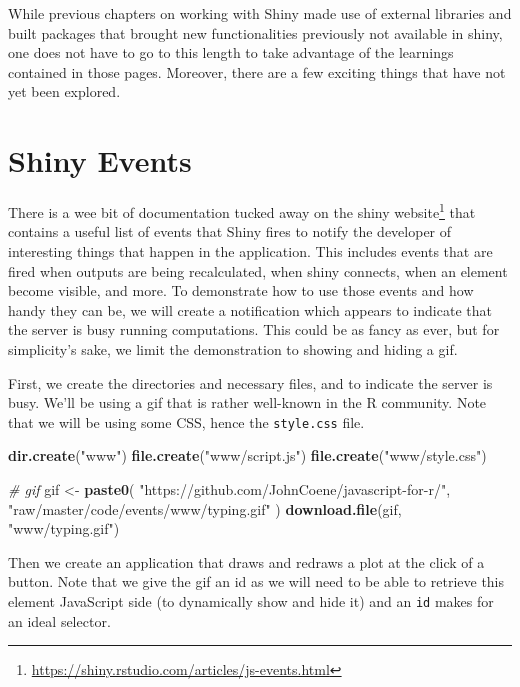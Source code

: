 \documentclass[
]{krantz}
\makeatletter
\newenvironment{Shaded}{\begin{snugshade}}{\end{snugshade}}
\newcommand{\CommentTok}[1]{\textcolor[rgb]{0.37,0.37,0.37}{\textit{#1}}}
\newcommand{\KeywordTok}[1]{\textcolor[rgb]{0.27,0.27,0.27}{\textbf{#1}}}
\newcommand{\NormalTok}[1]{#1}
\newcommand{\StringTok}[1]{\textcolor[rgb]{0.5,0.5,0.5}{#1}}
\renewcommand{\href}[2]{#2\footnote{\url{#1}}}
\newenvironment{kframe}{%
\medskip{}
\setlength{\fboxsep}{.8em}
 \def\at@end@of@kframe{}%
 \ifinner\ifhmode%
  \def\at@end@of@kframe{\end{minipage}}%
  \begin{minipage}{\columnwidth}%
 \fi\fi%
 \def\FrameCommand##1{\hskip\@totalleftmargin \hskip-\fboxsep
 \colorbox{shadecolor}{##1}\hskip-\fboxsep
     \hskip-\linewidth \hskip-\@totalleftmargin \hskip\columnwidth}%
 \MakeFramed {\advance\hsize-\width
   \@totalleftmargin\z@ \linewidth\hsize
   \@setminipage}}%
 {\par\unskip\endMakeFramed%
 \at@end@of@kframe}
\renewenvironment{Shaded}{\begin{kframe}}{\end{kframe}}
\makeatother
\begin{document}
While previous chapters on working with Shiny made use of external libraries and built packages that brought new functionalities previously not available in shiny, one does not have to go to this length to take advantage of the learnings contained in those pages. Moreover, there are a few exciting things that have not yet been explored.

\hypertarget{shiny-tips-events}{%
\section{Shiny Events}\label{shiny-tips-events}}

There is a wee bit of documentation tucked away on the \href{https://shiny.rstudio.com/articles/js-events.html}{shiny website} that contains a useful list of events that Shiny fires to notify the developer of interesting things that happen in the application. This includes events that are fired when outputs are being recalculated, when shiny connects, when an element become visible, and more. To demonstrate how to use those events and how handy they can be, we will create a notification which appears to indicate that the server is busy running computations. This could be as fancy as ever, but for simplicity's sake, we limit the demonstration to showing and hiding a gif.

First, we create the directories and necessary files, and to indicate the server is busy. We'll be using a gif that is rather well-known in the R community. Note that we will be using some CSS, hence the \texttt{style.css} file.

\begin{Shaded}
\begin{Highlighting}[]
\KeywordTok{dir.create}\NormalTok{(}\StringTok{"www"}\NormalTok{)}
\KeywordTok{file.create}\NormalTok{(}\StringTok{"www/script.js"}\NormalTok{)}
\KeywordTok{file.create}\NormalTok{(}\StringTok{"www/style.css"}\NormalTok{)}

\CommentTok{\# gif}
\NormalTok{gif <{-}}\StringTok{ }\KeywordTok{paste0}\NormalTok{(}
  \StringTok{"https://github.com/JohnCoene/javascript{-}for{-}r/"}\NormalTok{,}
  \StringTok{"raw/master/code/events/www/typing.gif"}
\NormalTok{)}
\KeywordTok{download.file}\NormalTok{(gif, }\StringTok{"www/typing.gif"}\NormalTok{)}
\end{Highlighting}
\end{Shaded}

Then we create an application that draws and redraws a plot at the click of a button. Note that we give the gif an id as we will need to be able to retrieve this element JavaScript side (to dynamically show and hide it) and an \texttt{id} makes for an ideal selector.
\end{document}
